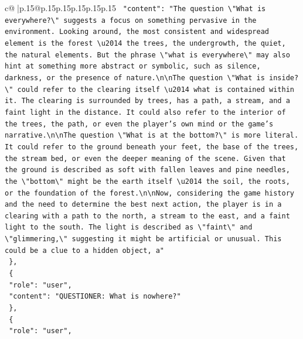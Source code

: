 \documentclass{article}
\begin{document}
{\begin{supertabular}{c@{$\;$}|p{.15\linewidth}@{}p{.15\linewidth}p{.15\linewidth}p{.15\linewidth}p{.15\linewidth}p{.15\linewidth}}
{{{\texttt{    "content": "The question \textbackslash{}"What is everywhere?\textbackslash{}" suggests a focus on something pervasive in the environment. Looking around, the most consistent and widespread element is the forest \textbackslash{}u2014 the trees, the undergrowth, the quiet, the natural elements. But the phrase \textbackslash{}"what is everywhere\textbackslash{}" may also hint at something more abstract or symbolic, such as silence, darkness, or the presence of nature.\textbackslash{}n\textbackslash{}nThe question \textbackslash{}"What is inside?\textbackslash{}" could refer to the clearing itself \textbackslash{}u2014 what is contained within it. The clearing is surrounded by trees, has a path, a stream, and a faint light in the distance. It could also refer to the interior of the trees, the path, or even the player's own mind or the game's narrative.\textbackslash{}n\textbackslash{}nThe question \textbackslash{}"What is at the bottom?\textbackslash{}" is more literal. It could refer to the ground beneath your feet, the base of the trees, the stream bed, or even the deeper meaning of the scene. Given that the ground is described as soft with fallen leaves and pine needles, the \textbackslash{}"bottom\textbackslash{}" might be the earth itself \textbackslash{}u2014 the soil, the roots, or the foundation of the forest.\textbackslash{}n\textbackslash{}nNow, considering the game history and the need to determine the best next action, the player is in a clearing with a path to the north, a stream to the east, and a faint light to the south. The light is described as \textbackslash{}"faint\textbackslash{}" and \textbackslash{}"glimmering,\textbackslash{}" suggesting it might be artificial or unusual. This could be a clue to a hidden object, a"} \\
\texttt{  \},} \\
\texttt{  \{} \\
\texttt{    "role": "user",} \\
\texttt{    "content": "QUESTIONER: What is nowhere?"} \\
\texttt{  \},} \\
\texttt{  \{} \\
\texttt{    "role": "user",} \\
}}}
\end{supertabular}}
\end{document}
